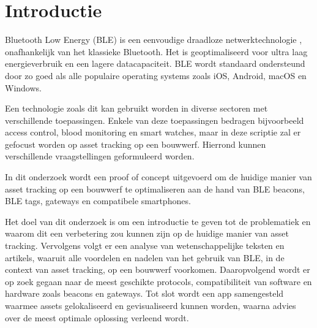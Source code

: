 
\section{Introductie}%
\label{sec:introductie}



Bluetooth Low Energy (BLE) is een eenvoudige draadloze netwerktechnologie \autocite{Heydon2013}, onafhankelijk van het klassieke Bluetooth. Het is geoptimaliseerd voor ultra laag energieverbruik en een lagere datacapaciteit. BLE wordt standaard ondersteund door zo goed als alle populaire operating systems zoals iOS, Android, macOS en Windows.

Een technologie zoals dit kan gebruikt worden in diverse sectoren met verschillende toepassingen. Enkele van deze toepassingen bedragen bijvoorbeeld access control, blood monitoring en smart watches, maar in deze scriptie zal er gefocust worden op asset tracking op een bouwwerf. Hierrond kunnen verschillende vraagstellingen geformuleerd worden.

In dit onderzoek wordt een proof of concept uitgevoerd om de huidige manier van asset tracking op een bouwwerf te optimaliseren aan de hand van BLE beacons, BLE tags, gateways en compatibele smartphones.

Het doel van dit onderzoek is om een introductie te geven tot de problematiek en waarom dit een verbetering zou kunnen zijn op de huidige manier van asset tracking. Vervolgens volgt er een analyse van wetenschappelijke teksten en artikels, waaruit alle voordelen en nadelen van het gebruik van BLE, in de context van asset tracking, op een bouwwerf voorkomen. Daaropvolgend wordt er op zoek gegaan naar de meest geschikte protocols, compatibiliteit van software en hardware zoals beacons en gateways. Tot slot wordt een app samengesteld waarmee assets gelokaliseerd en gevisualiseerd kunnen worden, waarna advies over de meest optimale oplossing verleend wordt.


